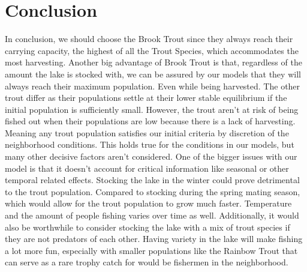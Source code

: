 \documentclass[letterpaper,12pt]{article}
\begin{document}
\section{Conclusion}
In conclusion, we should choose the Brook Trout since they always reach their carrying capacity, the highest of all the Trout Species, which accommodates the most harvesting. Another big advantage of Brook Trout is that, regardless of the amount the lake is stocked with, we can be assured by our models that they will always reach their maximum population. Even while being harvested. The other trout differ as their populations settle at their lower stable equilibrium if the initial population is sufficiently small. However, the trout aren’t at risk of being fished out when their populations are low because there is a lack of harvesting. Meaning any trout population satisfies our initial criteria by discretion of the neighborhood conditions. This holds true for the conditions in our models, but many other decisive factors aren’t considered.
One of the bigger issues with our model is that it doesn't account for critical information like seasonal or other temporal related effects. Stocking the lake in the winter could prove detrimental to the trout population. Compared to stocking during the spring mating season, which would allow for the trout population to grow much faster. Temperature and the amount of people fishing varies over time as well. Additionally, it would also be worthwhile to consider stocking the lake with a mix of trout species if they are not predators of each other. Having variety in the lake will make fishing a lot more fun, especially with smaller populations like the Rainbow Trout that can serve as a rare trophy catch for would be fishermen in the neighborhood.
\end{document}
